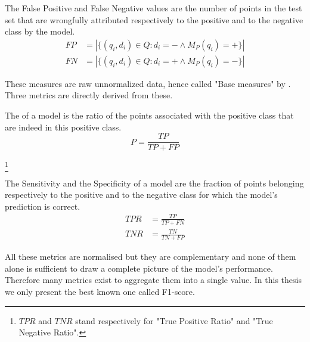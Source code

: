 \begin{definition}
The False Positive and False Negative values are the number of points in the test set that are wrongfully attributed respectively to the positive and to the negative class by the model.
\begin{equation}
    \begin{array}{ll}
         FP & = |\{(q_i, d_i)\in Q: d_i = - \land M_P(q_i) = +\}| \\
         FN & = |\{(q_i, d_i)\in Q: d_i = + \land M_P(q_i) = -\}|
    \end{array}
\end{equation}
\end{definition}

These measures are raw unnormalized data, hence called "Base measures" by \cite{Canbek2017_Class_metrics_terminology}. Three metrics are directly derived from these.

\begin{definition}
The  of a model is the ratio of the points associated with the positive class that are indeed in this positive class.
\begin{equation}
    P = \frac{TP}{TP+FP}
\end{equation}
\end{definition}

\begin{definition}\footnote{$TPR$ and $TNR$ stand respectively for "True Positive Ratio" and "True Negative Ratio".}
    
    The Sensitivity and the Specificity of a model are the fraction of points belonging respectively to the positive and to the negative class for which the model's prediction is correct.
    \begin{equation}
        \begin{array}{ll}
             TPR & = \frac{TP}{TP+FN}  \\
             TNR & = \frac{TN}{TN+FP}
        \end{array}
    \end{equation}
\end{definition}

All these metrics are normalised but they are complementary and none of them alone is sufficient to draw a complete picture of the model's performance. Therefore many metrics exist to aggregate them into a single value. In this thesis we only present the best known one called F1-score.

